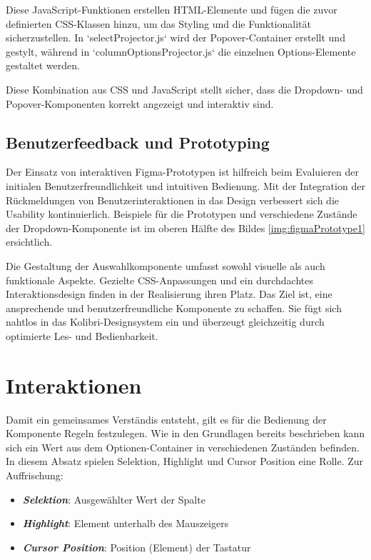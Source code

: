 Diese JavaScript-Funktionen erstellen HTML-Elemente und fügen die zuvor definierten CSS-Klassen hinzu, um das Styling und die Funktionalität sicherzustellen.
In `selectProjector.js` wird der Popover-Container erstellt und gestylt, während in `columnOptionsProjector.js` die einzelnen Options-Elemente gestaltet werden.

Diese Kombination aus CSS und JavaScript stellt sicher, dass die Dropdown- und Popover-Komponenten korrekt angezeigt und interaktiv sind.
\subsection{Benutzerfeedback und Prototyping}
\label{sec:userFeedbackPtototyping}

Der Einsatz von interaktiven Figma-Prototypen ist hilfreich beim Evaluieren der initialen Benutzerfreundlichkeit und intuitiven Bedienung. 
Mit der Integration der Rückmeldungen von Benutzerinteraktionen in das Design verbessert sich die Usability kontinuierlich.
Beispiele für die Prototypen und verschiedene Zustände der Dropdown-Komponente ist im oberen Hälfte des Bildes \ref{img:figmaPrototype1} ersichtlich.

Die Gestaltung der Auswahlkomponente umfasst sowohl visuelle als auch funktionale Aspekte. 
Gezielte CSS-Anpassungen und ein durchdachtes Interaktionsdesign finden in der Realisierung ihren Platz. 
Das Ziel ist, eine ansprechende und benutzerfreundliche Komponente zu schaffen. 
Sie fügt sich nahtlos in das Kolibri-Designsystem ein und überzeugt gleichzeitig durch optimierte Les- und Bedienbarkeit.

\section{Interaktionen}
\label{sec:interaction}

Damit ein gemeinsames Verständis entsteht, gilt es für die Bedienung der Komponente Regeln festzulegen.
Wie in den Grundlagen bereits beschrieben kann sich ein Wert aus dem Optionen-Container in verschiedenen Zuständen befinden.
In diesem Absatz spielen Selektion, Highlight und Cursor Position eine Rolle.
Zur Auffrischung: 

\begin{itemize}
    \item \textbf{\emph{Selektion}}: Ausgewählter Wert der Spalte
    \item \textbf{\emph{Highlight}}: Element unterhalb des Mauszeigers
    \item \textbf{\emph{Cursor Position}}: Position (Element) der Tastatur
\end{itemize}

